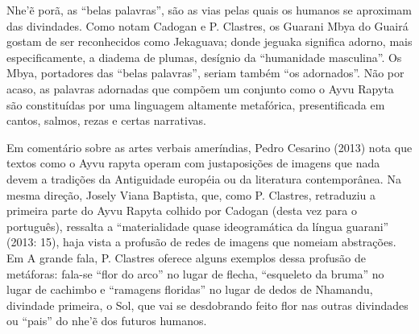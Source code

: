 Nhe’ẽ porã, as ``belas palavras'', são as vias pelas quais os
humanos se aproximam das divindades. Como notam Cadogan e P. Clastres,
os Guarani Mbya do Guairá gostam de ser reconhecidos como Jekaguava;
donde jeguaka significa adorno, mais especificamente, a diadema de
plumas, desígnio da ``humanidade masculina''. Os Mbya, portadores das
``belas palavras'', seriam também ``os adornados''. Não por acaso, as
palavras adornadas que compõem um conjunto como o Ayvu Rapyta são
constituídas por uma linguagem altamente metafórica, presentificada em
cantos, salmos, rezas e certas narrativas. 

Em comentário sobre as artes verbais ameríndias, Pedro Cesarino (2013)
nota que textos como o Ayvu rapyta operam com justaposições de imagens
que nada devem a tradições da Antiguidade européia ou da literatura
contemporânea. Na mesma direção, Josely Viana Baptista, que, como P.
Clastres, retraduziu a primeira parte do Ayvu Rapyta colhido por
Cadogan (desta vez para o português), ressalta a ``materialidade quase
ideogramática da língua guarani'' (2013: 15), haja vista a profusão de
redes de imagens que nomeiam abstrações. Em A grande fala, P. Clastres
oferece alguns exemplos dessa profusão de metáforas: fala-se ``flor do
arco'' no lugar de flecha, ``esqueleto da bruma'' no lugar de cachimbo e
``ramagens floridas'' no lugar de dedos de Nhamandu, divindade primeira,
o Sol, que vai se desdobrando feito flor nas outras divindades ou
``pais'' do nhe’ẽ dos futuros humanos.

